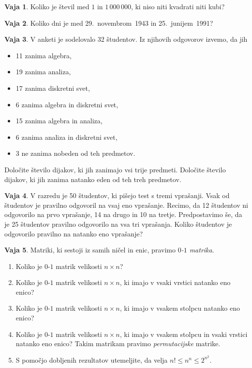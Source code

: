 \documentclass{article}
\theoremstyle{definition}
\newtheorem{vaja}{Vaja}
\begin{document}
\begin{vaja}
  Koliko je števil med $1$ in $1\,000\,000$, ki niso niti kvadrati niti kubi?
\end{vaja}

\begin{vaja}
  Koliko dni je med 29.~novembrom~1943 in 25.~junijem~1991?
\end{vaja}

\begin{vaja}
  V anketi je sodelovalo 32 študentov. Iz njihovih odgovorov izvemo, da jih
  \begin{itemize}
    \item 11 zanima algebra,
    \item 19 zanima analiza,
    \item 17 zanima diskretni svet,
    \item 6 zanima algebra in diskretni svet,
    \item 15 zanima algebra in analiza,
    \item 6 zanima analiza in diskretni svet,
    \item 3 ne zanima nobeden od teh predmetov.
  \end{itemize}
  Določite število dijakov, ki jih zanimajo vsi trije predmeti. Določite število dijakov, ki jih zanima natanko eden od teh treh predmetov.
\end{vaja}

\begin{vaja}
  V razredu je 50 študentov, ki pišejo test s tremi vprašanji. Vsak od študentov je pravilno odgovoril na vsaj eno vprašanje. Recimo, da 12 študentov ni odgovorilo na prvo vprašanje, 14 na drugo in 10 na tretje. Predpostavimo še, da je 25 študentov pravilno odgovorilo na vsa tri vprašanja. Koliko študentov je odgovorilo pravilno na natanko eno vprašanje? 
\end{vaja}

\begin{vaja}
  Matriki, ki sestoji iz samih ničel in enic, pravimo \emph{$0$-$1$ matrika}.
  \begin{enumerate}
    \item
      Koliko je $0$-$1$ matrik velikosti $n \times n$?
    \item
      Koliko je $0$-$1$ matrik velikosti $n \times n$, ki imajo v vsaki vrstici natanko eno enico?
    \item
      Koliko je $0$-$1$ matrik velikosti $n \times n$, ki imajo v vsakem stolpcu natanko eno enico?
    \item
      Koliko je $0$-$1$ matrik velikosti $n \times n$, ki imajo v vsakem stolpcu in vsaki vrstici natanko eno enico? Takim matrikam pravimo \emph{permutacijske} matrike.
    \item
      S pomočjo dobljenih rezultatov utemeljite, da velja $n! \leq n^n \leq 2^{n^2}$.
  \end{enumerate}
\end{vaja}
\end{document}
